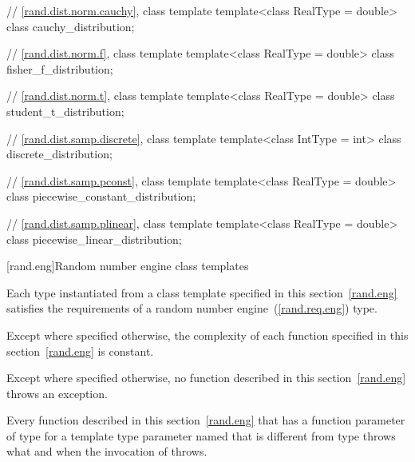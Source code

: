 \begin{codeblock}
{  // \ref{rand.dist.norm.cauchy}, class template 
  template<class RealType = double>
    class cauchy_distribution;

  // \ref{rand.dist.norm.f}, class template 
  template<class RealType = double>
    class fisher_f_distribution;

  // \ref{rand.dist.norm.t}, class template 
  template<class RealType = double>
    class student_t_distribution;

  // \ref{rand.dist.samp.discrete}, class template 
  template<class IntType = int>
    class discrete_distribution;

  // \ref{rand.dist.samp.pconst}, class template 
  template<class RealType = double>
    class piecewise_constant_distribution;

  // \ref{rand.dist.samp.plinear}, class template 
  template<class RealType = double>
    class piecewise_linear_distribution;
}
\end{codeblock}%
%
%




[rand.eng]{Random number engine class templates}%

\pnum
Each type instantiated
from a class template specified in this section~\ref{rand.eng}
satisfies the requirements
of a random number engine~(\ref{rand.req.eng}) type.

\pnum
Except where specified otherwise,
the complexity of each function
specified in this section~\ref{rand.eng}
is constant.

\pnum
Except where specified otherwise,
no function described in this section~\ref{rand.eng}
throws an exception.

\pnum
Every function described in this section~\ref{rand.eng}
that has a function parameter  of type 
for a template type parameter named 
that is different from type 
throws what and when the invocation of  throws.

